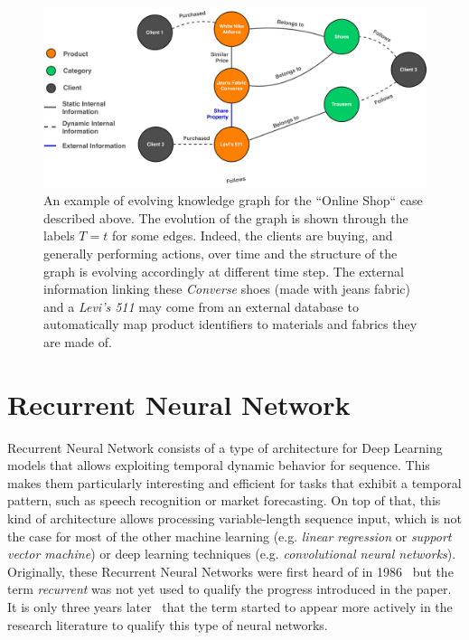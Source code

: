 \newpage
\begin{figure}
	\centering
	\includegraphics[width=.75\linewidth]{figures/kg-online-shop.pdf}
	\caption{
		An example of evolving knowledge graph for the ``Online Shop`` case described above. The evolution of the graph is shown through the labels $T=t$ for some edges. Indeed, the clients are buying, and generally performing actions, over time and the structure of the graph is evolving accordingly at different time step. The external information linking these \textit{Converse} shoes (made with jeans fabric) and a \textit{Levi's 511} may come from an external database to automatically map product identifiers to materials and fabrics they are made of.
	}
	\label{fig:kg-online-shop}
\end{figure}

\section{Recurrent Neural Network}
\label{sec:Recurrent Neural Network}
Recurrent Neural Network consists of a type of architecture for Deep Learning models that allows exploiting temporal dynamic behavior for sequence. This makes them particularly interesting and efficient for tasks that exhibit a temporal pattern, such as speech recognition or market forecasting. On top of that, this kind of architecture allows processing variable-length sequence input, which is not the case for most of the other machine learning (e.g. \textit{linear regression} or \textit{support vector machine}) or deep learning techniques (e.g. \textit{convolutional neural networks}).\\

Originally, these Recurrent Neural Networks were first heard of in 1986~\cite{10008954896} but the term \emph{recurrent} was not yet used to qualify the progress introduced in the paper. It is only three years later~\cite{6796948} that the term started to appear more actively in the research literature to qualify this type of neural networks. \\

